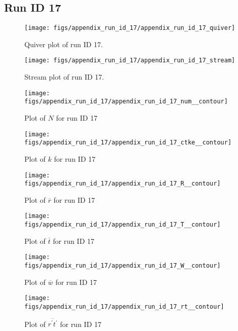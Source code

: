 \subsection{Run ID 17}
\begin{figure}[H]
\centering
\texttt{[image: figs/appendix\_run\_id\_17/appendix\_run\_id\_17\_quiver]}
\caption{Quiver plot of run ID 17.}
\label{fig:appendix_run_id_17_quiver}
\end{figure}


\begin{figure}[H]
\centering
\texttt{[image: figs/appendix\_run\_id\_17/appendix\_run\_id\_17\_stream]}
\caption{Stream plot of run ID 17.}
\label{fig:appendix_run_id_17_stream}
\end{figure}


\begin{figure}[H]
\centering
\texttt{[image: figs/appendix\_run\_id\_17/appendix\_run\_id\_17\_num\_\_contour]}
\caption{Plot of $N$ for run ID 17}
\label{fig:appendix_run_id_17_num__contour}
\end{figure}


\begin{figure}[H]
\centering
\texttt{[image: figs/appendix\_run\_id\_17/appendix\_run\_id\_17\_ctke\_\_contour]}
\caption{Plot of $k$ for run ID 17}
\label{fig:appendix_run_id_17_ctke__contour}
\end{figure}


\begin{figure}[H]
\centering
\texttt{[image: figs/appendix\_run\_id\_17/appendix\_run\_id\_17\_R\_\_contour]}
\caption{Plot of $\overline{r}$ for run ID 17}
\label{fig:appendix_run_id_17_R__contour}
\end{figure}


\begin{figure}[H]
\centering
\texttt{[image: figs/appendix\_run\_id\_17/appendix\_run\_id\_17\_T\_\_contour]}
\caption{Plot of $\overline{t}$ for run ID 17}
\label{fig:appendix_run_id_17_T__contour}
\end{figure}


\begin{figure}[H]
\centering
\texttt{[image: figs/appendix\_run\_id\_17/appendix\_run\_id\_17\_W\_\_contour]}
\caption{Plot of $\overline{w}$ for run ID 17}
\label{fig:appendix_run_id_17_W__contour}
\end{figure}


\begin{figure}[H]
\centering
\texttt{[image: figs/appendix\_run\_id\_17/appendix\_run\_id\_17\_rt\_\_contour]}
\caption{Plot of $\overline{r^\prime t^\prime}$ for run ID 17}
\label{fig:appendix_run_id_17_rt__contour}
\end{figure}


